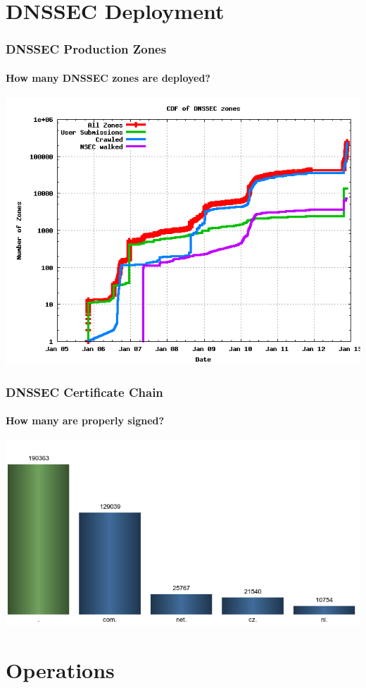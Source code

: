\documentclass{beamer}
\begin{document}
\section{DNSSEC Deployment}

\begin{frame}
  \frametitle{DNSSEC Production Zones}
  \framesubtitle{How many DNSSEC zones are deployed?}
  \includegraphics[width=.9\textwidth]{dnssec-growth}
\end{frame}

\begin{frame}
  \frametitle{DNSSEC Certificate Chain}
  \framesubtitle{How many are properly signed?}
  \includegraphics[width=\textwidth]{dnssec-on-tlds}

\end{frame}

\section{Operations}
\end{document}
